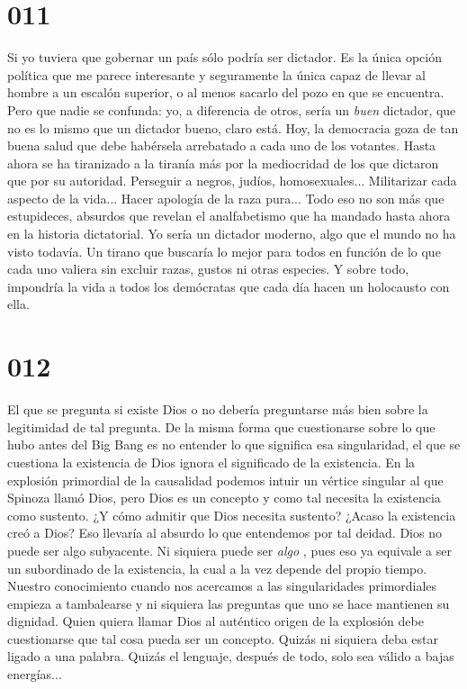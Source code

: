 \documentclass[a4paper,11pt,openright,twocolumn]{book}
\begin{document}
\section*{011}

Si yo tuviera que gobernar un país sólo podría ser dictador. Es la única opción política que me parece interesante y seguramente la única capaz de llevar al hombre a un escalón superior, o al menos sacarlo del pozo en que se encuentra. Pero que nadie se confunda: yo, a diferencia de otros, sería un {\it  buen }   dictador, que no es lo mismo que un dictador bueno, claro está. Hoy, la democracia goza de tan buena salud que debe habérsela arrebatado a cada uno de los votantes. Hasta ahora se ha tiranizado a la tiranía más por la mediocridad de los que dictaron que por su autoridad.  Perseguir a negros, judíos, homosexuales... Militarizar cada aspecto de la vida... Hacer apología de la raza pura... Todo eso no son más que estupideces, absurdos que revelan el analfabetismo que ha mandado hasta ahora en la historia dictatorial. Yo sería un dictador moderno, algo que el mundo no ha visto todavía. Un tirano que buscaría lo mejor para todos en función de lo que cada uno valiera sin excluir razas, gustos ni otras especies. Y sobre todo, impondría la vida a todos los demócratas que cada día hacen un holocausto con ella.

\section*{012}

El que se pregunta si existe Dios o no debería preguntarse más bien sobre la legitimidad de tal pregunta. De la misma forma que cuestionarse sobre lo que hubo antes del Big Bang es no entender lo que significa esa singularidad, el que se cuestiona la existencia de Dios ignora el significado de la existencia. En la explosión primordial de la causalidad podemos intuir un vértice singular al que Spinoza llamó Dios, pero Dios es un concepto y como tal necesita la existencia como sustento. ¿Y cómo admitir que Dios necesita sustento? ¿Acaso la existencia creó a Dios? Eso llevaría al absurdo lo que entendemos por tal deidad. Dios no puede ser algo subyacente. Ni siquiera puede ser {\it algo}  , pues eso ya equivale a ser un subordinado de la existencia, la cual a la vez depende del propio tiempo. Nuestro conocimiento cuando nos acercamos a las singularidades primordiales empieza a tambalearse y ni siquiera las preguntas que uno se hace mantienen su dignidad. Quien quiera llamar Dios al auténtico origen de la explosión debe cuestionarse que tal cosa pueda ser un concepto. Quizás ni siquiera deba estar ligado a una palabra. Quizás el lenguaje, después de todo, solo sea válido a bajas energías...
\end{document}

